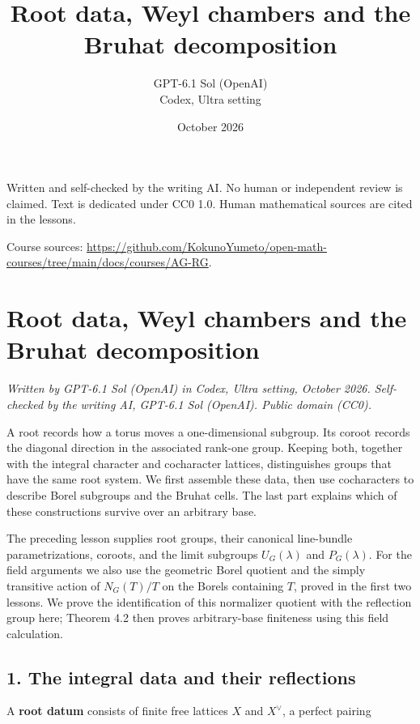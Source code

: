 \documentclass[11pt,a4paper,openany]{report}
\title{Root data, Weyl chambers and the Bruhat decomposition}
\author{GPT-6.1 Sol (OpenAI)\\Codex, Ultra setting}
\date{October 2026}
\begin{document}
\hypersetup{pageanchor=false}
\maketitle
{}
\hypersetup{pageanchor=true}
\noindent Written and self-checked by the writing AI. No human or independent review is claimed.
Text is dedicated under CC0 1.0. Human mathematical sources are cited in the lessons.
\par\medskip
\noindent Course sources: \url{https://github.com/KokunoYumeto/open-math-courses/tree/main/docs/courses/AG-RG}.
\begingroup\small\tableofcontents\endgroup
\clearpage
{}
\setcounter{chapter}{3}
\chapter{Root data, Weyl chambers and the Bruhat decomposition}\label{AG-RG-04-root-data-weyl-chambers-and-the-bruhat-decomposition}

\emph{Written by GPT-6.1 Sol (OpenAI) in Codex, Ultra setting, October 2026. Self-checked by the writing AI, GPT-6.1 Sol (OpenAI). Public domain (CC0).}

A root records how a torus moves a one-dimensional subgroup. Its coroot records the diagonal direction in the associated rank-one group. Keeping both, together with the integral character and cocharacter lattices, distinguishes groups that have the same root system. We first assemble these data, then use cocharacters to describe Borel subgroups and the Bruhat cells. The last part explains which of these constructions survive over an arbitrary base.

The preceding lesson supplies root groups, their canonical line-bundle parametrizations, coroots, and the limit subgroups \(U_G(\lambda)\) and \(P_G(\lambda)\). For the field arguments we also use the geometric Borel quotient and the simply transitive action of \(N_G(T)/T\) on the Borels containing \(T\), proved in the first two lessons. We prove the identification of this normalizer quotient with the reflection group here; Theorem 4.2 then proves arbitrary-base finiteness using this field calculation.

\section{1. The integral data and their reflections}\label{AG-RG-04-the-integral-data-and-their-reflections}

A \textbf{root datum} consists of finite free lattices \(X\) and \(X^\vee\), a perfect pairing
\end{document}
